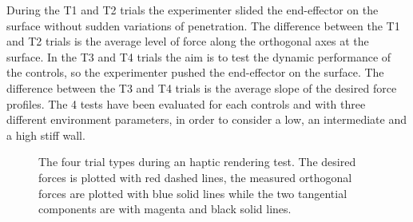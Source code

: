 During the T1 and T2 trials the experimenter slided the end-effector on the surface without sudden variations of penetration. The difference between the T1 and T2 trials is the average level of force along the orthogonal axes at the surface.
In the T3 and T4 trials the aim is to test the dynamic performance of the controls, so the experimenter pushed the end-effector on the surface. The difference between the T3 and T4 trials is the average slope of the desired force profiles.
The 4 tests have been evaluated for each controls and with three different environment parameters, in order to consider a low, an intermediate and a high stiff wall. 
\begin{figure}[htb]
	\centering
\DIFdelbeginFL %
\DIFdelendFL %
\DIFaddbeginFL \def\svgwidth{1\columnwidth}
	\begin{footnotesize}
		
	\end{footnotesize}
	\DIFaddendFL \caption{The four trial types during an haptic rendering test. The desired forces is plotted with red dashed lines, the measured orthogonal forces are plotted with blue solid lines while the two tangential components are with magenta and black solid lines.}
	\label{fig:renderingTestType}
\end{figure}

